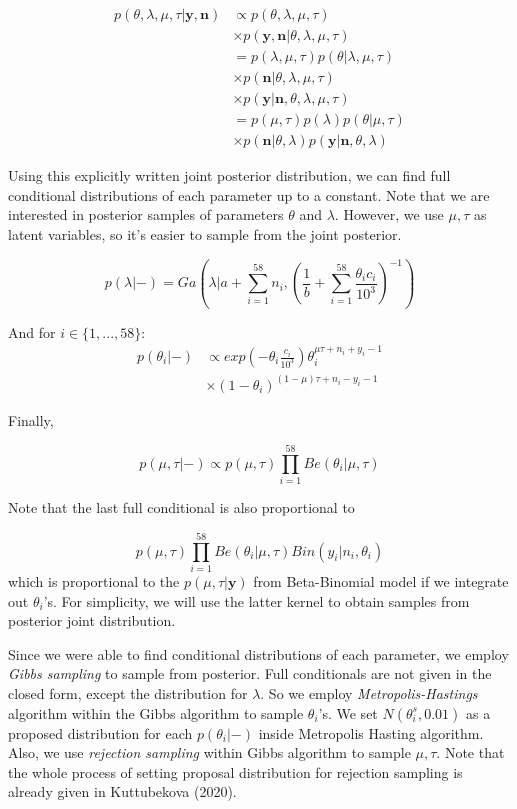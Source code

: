 \documentclass[11pt,twocolumn]{asaproc}
\begin{document}
\begin{align*}
p(\theta, \lambda, \mu, \tau |\mathbf{y}, \mathbf{n} ) & \propto  p(\theta, \lambda, \mu, \tau) \\
& \times p(\mathbf{y}, \mathbf{n} |\theta, \lambda , \mu, \tau) \\
& = p(\lambda, \mu, \tau) p(\theta | \lambda, \mu, \tau) \\
& \times p(\mathbf{n} | \theta, \lambda, \mu, \tau) \\
& \times p(\mathbf{y}| \mathbf{n}, \theta, \lambda, \mu, \tau) \\
& = p(\mu, \tau) p(\lambda) p(\theta|\mu, \tau) \\
& \times p(\mathbf{n}| \theta, \lambda) p(\mathbf{y} | \mathbf{n}, \theta, \lambda)
\end{align*}

Using this explicitly written joint posterior distribution, we can find full conditional distributions of each parameter up to a constant. Note that we are interested in posterior samples of parameters $\theta$ and $\lambda$. However, we use $\mu, \tau$ as latent variables, so it's easier to sample from the joint posterior. 

$$p(\lambda | -) = Ga(\lambda |a + \sum_{i=1}^{58}n_i, (\frac{1}{b} + \sum_{i=1}^{58}\frac{\theta_i c_i}{10^3})^{-1})$$

And for $i \in \{1, ..., 58\}$:
\begin{align*}
p(\theta_i| - ) & \propto exp(-\theta_i\frac{ c_i}{10^3}) \theta_i^{\mu\tau + n_i + y_i - 1}\\
& \times (1-\theta_i)^{(1-\mu)\tau + n_i - y_i - 1}
\end{align*}

Finally, 

$$p(\mu, \tau | -) \propto p(\mu, \tau)\prod_{i=1}^{58}Be(\theta_i|\mu, \tau)$$

Note that the last full conditional is also proportional to 

$$p(\mu, \tau)\prod_{i=1}^{58}Be(\theta_i|\mu, \tau)Bin(y_i|n_i, \theta_i)$$ which is proportional to the $p(\mu, \tau | \mathbf{y})$ from Beta-Binomial model if we integrate out $\theta_i$'s. For simplicity, we will use the latter kernel to obtain samples from posterior joint distribution.


Since we were able to find conditional distributions of each parameter, we employ \textit{Gibbs sampling} to sample from posterior. Full conditionals are not given in the closed form, except the distribution for $\lambda$. So we employ \textit{Metropolis-Hastings} algorithm within the Gibbs algorithm to sample $\theta_i$'s. We set $N(\theta_i^{s}, 0.01)$ as a proposed distribution for each $p(\theta_i |-)$ inside Metropolis Hasting algorithm. Also, we use \textit{rejection sampling} within Gibbs algorithm to sample $\mu, \tau$. Note that the whole process of setting proposal distribution for rejection sampling is already given in Kuttubekova (2020). 
\end{document}
